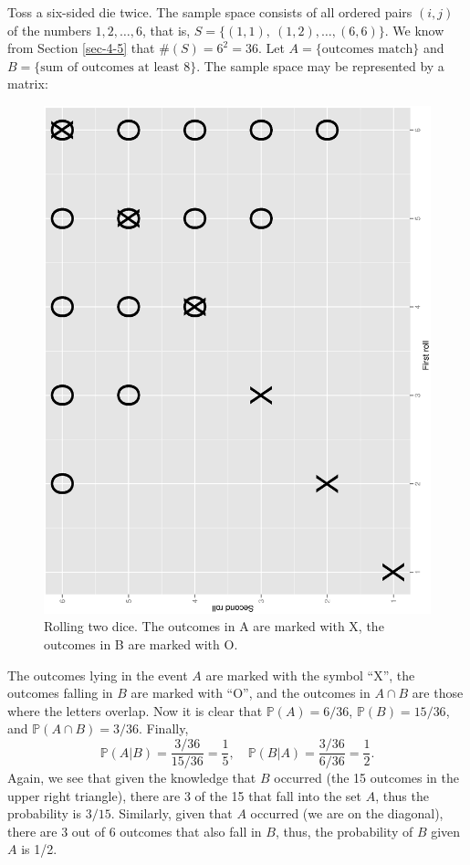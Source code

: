 \documentclass[captions=tableheading]{scrbook}
\begin{document}
\begin{example}
Toss a six-sided die twice. The sample space consists of all ordered pairs \((i,j)\) of the numbers \(1,2,\ldots,6\), that is, \( S = \{ (1,1),\ (1,2),\ldots,(6,6) \} \). We know from Section \ref{sec-4-5} that \( \# (S) = 6^{2} = 36 \). Let \( A = \{ \mbox{outcomes match} \} \) and \( B = \{ \mbox{sum of outcomes at least 8} \} \). The sample space may be represented by a matrix:








\begin{figure}[th]
  \includegraphics[angle=270, totalheight=4in]{ps/prob/twodiceAB.ps}
  \caption[Rolling two dice]{\small Rolling two dice. The outcomes in A are marked with X, the outcomes in B are marked with O.}
  \label{fig-twodiceAB}
\end{figure}


The outcomes lying in the event \(A\) are marked with the symbol ``X'', the outcomes falling in \(B\) are marked with ``O'', and the outcomes in \(A\cap B\) are those where the letters overlap. Now it is clear that \(\mathbb{P}(A)=6/36\), \(\mathbb{P}(B)=15/36\), and \(\mathbb{P}(A\cap B)=3/36\).  Finally, 
\[
\mathbb{P}(A|B)=\frac{3/36}{15/36}=\frac{1}{5},\quad \mathbb{P}(B|A)=\frac{3/36}{6/36}=\frac{1}{2}.
\]
Again, we see that given the knowledge that \(B\) occurred (the 15 outcomes in the upper right triangle), there are 3 of the 15 that fall into the set \(A\), thus the probability is \(3/15\). Similarly, given that \(A\) occurred (we are on the diagonal), there are 3 out of 6 outcomes that also fall in \(B\), thus, the probability of \(B\) given \(A\) is 1/2. 
\end{example}
\end{document}
